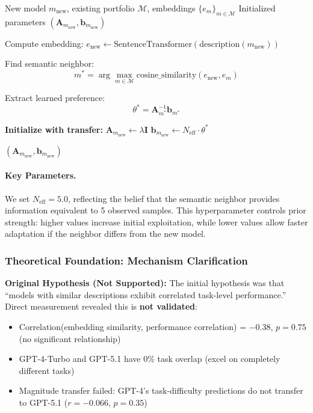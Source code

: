 \begin{algorithm}[t]
\caption{Semantic Transfer for New Model Admission}
\label{alg:semantic-transfer}
\begin{algorithmic}[1]
\REQUIRE New model $m_{\text{new}}$, existing portfolio $\mathcal{M}$, embeddings $\{e_m\}_{m \in \mathcal{M}}$
\ENSURE Initialized parameters $(\mathbf{A}_{m_{\text{new}}}, \mathbf{b}_{m_{\text{new}}})$

\STATE Compute embedding: $e_{\text{new}} \leftarrow \text{SentenceTransformer}(\text{description}(m_{\text{new}}))$

\STATE Find semantic neighbor:
\[
m^* = \arg\max_{m \in \mathcal{M}} \text{cosine\_similarity}(e_{\text{new}}, e_m)
\]

\STATE Extract learned preference:
\[
\theta^* = \mathbf{A}_{m^*}^{-1} \mathbf{b}_{m^*}
\]

\STATE \textbf{Initialize with transfer:}
\STATE \quad $\mathbf{A}_{m_{\text{new}}} \leftarrow \lambda \mathbf{I}$ 
\STATE \quad $\mathbf{b}_{m_{\text{new}}} \leftarrow N_{\text{eff}} \cdot \theta^*$ 

\RETURN $(\mathbf{A}_{m_{\text{new}}}, \mathbf{b}_{m_{\text{new}}})$
\end{algorithmic}
\end{algorithm}

\paragraph{Key Parameters.}
We set $N_{\text{eff}} = 5.0$, reflecting the belief that the semantic neighbor provides information equivalent to 5 observed samples. This hyperparameter controls prior strength: higher values increase initial exploitation, while lower values allow faster adaptation if the neighbor differs from the new model.

\subsubsection{Theoretical Foundation: Mechanism Clarification}

\textbf{Original Hypothesis (Not Supported):} The initial hypothesis was that ``models with similar descriptions exhibit correlated task-level performance.'' Direct measurement revealed this is \textbf{not validated}:
\begin{itemize}
    \item Correlation(embedding similarity, performance correlation) = $-0.38$, $p=0.75$ (no significant relationship)
    \item GPT-4-Turbo and GPT-5.1 have 0\% task overlap (excel on completely different tasks)
    \item Magnitude transfer failed: GPT-4's task-difficulty predictions do not transfer to GPT-5.1 ($r=-0.066$, $p=0.35$)
\end{itemize}


